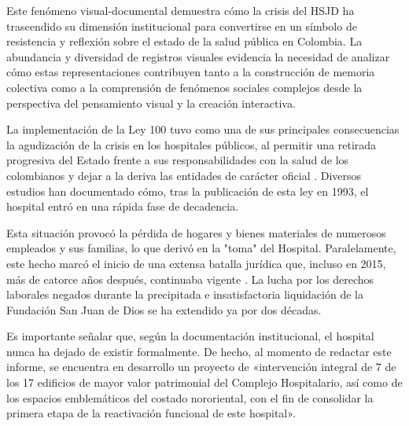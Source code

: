 Este fenómeno visual-documental demuestra cómo la crisis del HSJD ha trascendido su dimensión institucional para convertirse en un símbolo de resistencia y reflexión sobre el estado de la salud pública en Colombia. La abundancia y diversidad de registros visuales evidencia la necesidad de analizar cómo estas representaciones contribuyen tanto a la construcción de memoria colectiva como a la comprensión de fenómenos sociales complejos desde la perspectiva del pensamiento visual y la creación interactiva.

La implementación de la Ley 100 tuvo como una de sus principales consecuencias la agudización de la crisis en los hospitales públicos, al permitir una retirada progresiva del Estado frente a sus responsabilidades con la salud de los colombianos y dejar a la deriva las entidades de carácter oficial \parencite{Castiblanco2017}. Diversos estudios han documentado cómo, tras la publicación de esta ley en 1993, el hospital entró en una rápida fase de decadencia.

Esta situación provocó la pérdida de hogares y bienes materiales de numerosos empleados y sus familias, lo que derivó en la "toma" del Hospital. Paralelamente, este hecho marcó el inicio de una extensa batalla jurídica que, incluso en 2015, más de catorce años después, continuaba vigente \parencite{Orlando2015}. La lucha por los derechos laborales negados durante la precipitada e insatisfactoria liquidación de la Fundación San Juan de Dios se ha extendido ya por dos décadas.

Es importante señalar que, según la documentación institucional, el hospital nunca ha dejado de existir formalmente. De hecho, al momento de redactar este informe, se encuentra en desarrollo un proyecto de «intervención integral de 7 de los 17 edificios de mayor valor patrimonial del Complejo Hospitalario, así como de los espacios emblemáticos del costado nororiental, con el fin de consolidar la primera etapa de la reactivación funcional de este hospital».